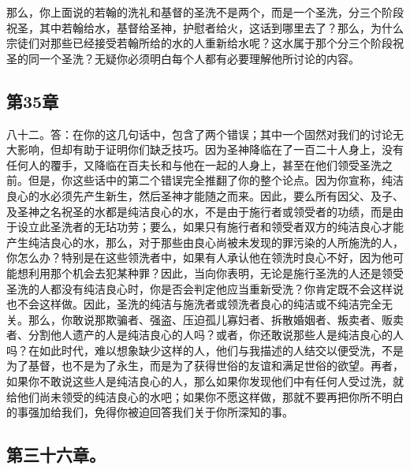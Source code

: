 那么，你上面说的若翰的洗礼和基督的圣洗不是两个，而是一个圣洗，分三个阶段祝圣，其中若翰给水，基督给圣神，护慰者给火，这话到哪里去了？那么，为什么宗徒们对那些已经接受若翰所给的水的人重新给水呢？这水属于那个分三个阶段祝圣的同一个圣洗？无疑你必须明白每个人都有必要理解他所讨论的内容。\par


\subsection{第35章}

\par

八十二。答：在你的这几句话中，包含了两个错误；其中一个固然对我们的讨论无大影响，但却有助于证明你们缺乏技巧。因为圣神降临在了一百二十人身上，没有任何人的覆手，又降临在百夫长和与他在一起的人身上，甚至在他们领受圣洗之前。但是，你这些话中的第二个错误完全推翻了你的整个论点。因为你宣称，纯洁良心的水必须先产生新生，然后圣神才能随之而来。因此，要么所有因父、及子、及圣神之名祝圣的水都是纯洁良心的水，不是由于施行者或领受者的功绩，而是由于设立此圣洗者的无玷功劳；要么，如果只有施行者和领受者双方的纯洁良心才能产生纯洁良心的水，那么，对于那些由良心尚被未发现的罪污染的人所施洗的人，你怎么办？特别是在这些领洗者中，如果有人承认他在领洗时良心不好，因为他可能想利用那个机会去犯某种罪？因此，当向你表明，无论是施行圣洗的人还是领受圣洗的人都没有纯洁良心时，你是否会判定他应当重新受洗？你肯定既不会这样说也不会这样做。因此，圣洗的纯洁与施洗者或领洗者良心的纯洁或不纯洁完全无关。那么，你敢说那欺骗者、强盗、压迫孤儿寡妇者、拆散婚姻者、叛卖者、贩卖者、分割他人遗产的人是纯洁良心的人吗？或者，你还敢说那些人是纯洁良心的人吗？在如此时代，难以想象缺少这样的人，他们与我描述的人结交以便受洗，不是为了基督，也不是为了永生，而是为了获得世俗的友谊和满足世俗的欲望。再者，如果你不敢说这些人是纯洁良心的人，那么如果你发现他们中有任何人受过洗，就给他们尚未领受的纯洁良心的水吧；如果你不愿这样做，那就不要再把你所不明白的事强加给我们，免得你被迫回答我们关于你所深知的事。\par


\subsection{第三十六章。}

